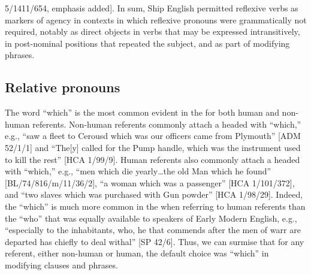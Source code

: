 5/1411/654, emphasis added]. In sum, Ship English permitted reflexive verbs as markers of  agency in contexts in which reflexive pronouns were grammatically not required, notably as direct objects in verbs that may be expressed intransitively, in post-nominal positions that repeated the subject, and as part of modifying phrases. 

\subsection{{Relative pronouns}}\label{sec:5.4.6}

The word “which” is the most common  evident in the  for both human and non-human referents. Non-human  referents commonly attach a  headed with “which,” e.g., “saw a fleet to Cerousd which was our officers came from Plymouth” [ADM 52/1/1] and “The[y] called for the Pump handle, which was the instrument used to kill the rest” [HCA 1/99/9]. Human  referents also commonly attach a  headed with “which,” e.g., “men which die yearly…the old Man which he found” [BL/74/816/m/11/36/2], “a woman which was a passenger” [HCA 1/101/372], and “two slaves which was purchased with Gun powder” [HCA 1/98/29]. Indeed, the  “which” is much more common in the  when referring to human referents than the  “who” that was equally available to speakers of Early Modern English, e.g., “especially to the inhabitants, who, he that commends after the men of warr are departed has chiefly to deal withal” [SP 42/6]. Thus, we can surmise that for any  referent, either non-human or human, the default  choice was “which” in modifying clauses and phrases. 

